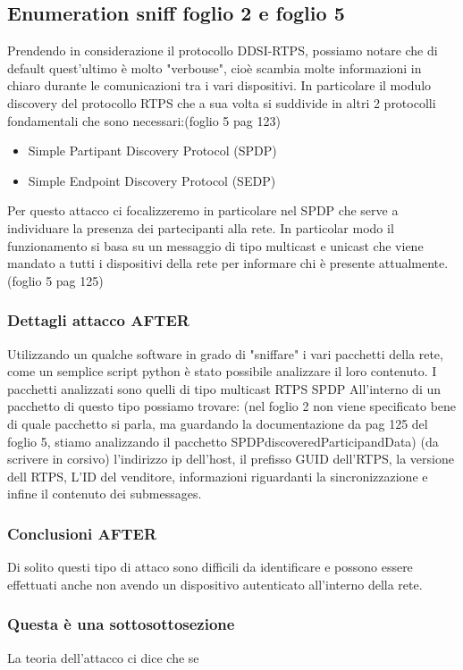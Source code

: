 \subsection{Enumeration sniff foglio 2 e foglio 5}
Prendendo in considerazione il protocollo DDSI-RTPS, possiamo notare che di
default quest'ultimo è molto "verbouse", cioè scambia molte informazioni in
chiaro durante le comunicazioni tra i vari dispositivi. In particolare
il modulo discovery del protocollo RTPS che a sua volta si suddivide in
altri 2 protocolli fondamentali che sono necessari:(foglio 5 pag 123)
\begin{itemize}
    \item Simple Partipant Discovery Protocol (SPDP)
    \item Simple Endpoint Discovery Protocol (SEDP)
\end{itemize}
Per questo attacco ci focalizzeremo in particolare nel SPDP che serve a
individuare la presenza dei partecipanti alla rete. In particolar modo
il funzionamento si basa su un messaggio di tipo multicast e unicast che viene
mandato a tutti i dispositivi della rete per informare chi è presente attualmente.
(foglio 5 pag 125)

\subsubsection{Dettagli attacco AFTER}
Utilizzando un qualche software in grado di "sniffare" i vari pacchetti della
rete, come un semplice script python è stato possibile analizzare il loro
contenuto. I pacchetti analizzati sono quelli di tipo multicast RTPS SPDP
All'interno di un pacchetto di questo tipo possiamo trovare: (nel foglio 2 
non viene specificato bene di quale pacchetto si parla, ma guardando la documentazione
da pag 125 del foglio 5, stiamo analizzando il pacchetto SPDPdiscoveredParticipandData)
(da scrivere in corsivo) l'indirizzo ip dell'host, il prefisso GUID dell'RTPS,
la versione dell RTPS, L'ID del venditore, informazioni riguardanti la sincronizzazione
e infine il contenuto dei submessages.


\subsubsection{Conclusioni AFTER}
Di solito questi tipo di attaco sono difficili da identificare e possono essere
effettuati anche non avendo un dispositivo autenticato all'interno della rete.



\subsubsection{Questa è una sottosottosezione}
La teoria dell'attacco ci dice che se 


